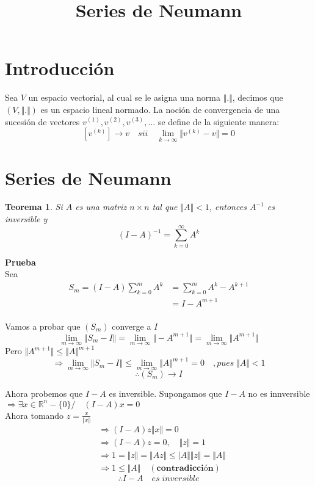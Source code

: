 \documentclass[10pt,a4paper]{article}
\title{Series de Neumann}
\newcommand{\ds}{\displaystyle}
\newcommand{\re}{\mathbb{R}}
\newtheorem{theo}{Teorema}[section]
\begin{document}
\maketitle

\section{Introducción}

Sea $V$ un espacio vectorial, al cual se le asigna una norma $\Vert .\Vert$, decimos que $(V, \Vert .\Vert)$ es un espacio lineal normado.
La noción de convergencia de una sucesión de vectores $v^{(1)}, v^{(2)}, v^{(3)},\ldots$ se define de la siguiente manera:
$$[v^{(k)}]\rightarrow v\quad sii\quad\lim_{k\rightarrow\infty}\Vert v^{(k)}-v\Vert = 0$$

\section{Series de Neumann}

\begin{theo}
	Si $A$ es una matriz $n\times n$ tal que $\Vert A\Vert <1$, entonces $A^{-1}$ es inversible y
	\begin{equation}\label{neuman's serie}
		(I-A)^{-1} = \sum_{k=0}^{\infty}A^{k} 
	\end{equation}
\end{theo}

\textbf{Prueba}\\
Sea 
\begin{align*}
	S_{m} 	= (I-A)\ds\sum_{k=0}^{m}A^{k} &= \ds\sum_{k=0}^{m}A^{k}-A^{k+1}\\
			&= I -A^{m+1}\\							 
\end{align*}

Vamos a probar que $(S_{m})$  converge a $I$
$$\lim_{m\rightarrow\infty}\Vert S_{m}-I\Vert = \lim_{m\rightarrow\infty}\Vert -A^{m+1}\Vert = \lim_{m\rightarrow\infty}\Vert A^{m+1}\Vert$$
Pero $\Vert A^{m+1}\Vert \leq\Vert A\Vert^{m+1}$
$$\Rightarrow\lim_{m\rightarrow\infty}\Vert S_{m}-I\Vert\leq\lim_{m\rightarrow\infty}\Vert A\Vert^{m+1} = 0\quad , pues\; \Vert A\Vert <1$$
\begin{equation}\label{convergencia_neumann}
\therefore (S_{m}) \rightarrow I
\end{equation}

Ahora probemos que $I-A$ es inversible.
Supongamos que $I-A$ no es innversible\\
$\Rightarrow\exists x\in \re^{n}-\{0\}/\quad (I-A)x = 0$\\
Ahora tomando $z = \frac{x}{\Vert x \Vert}$
\begin{align*}
	&\Rightarrow (I-A)z\Vert x\Vert = 0\\
	&\Rightarrow (I-A)z = 0,\quad\Vert z\Vert = 1\\
	&\Rightarrow 1 = \Vert z\Vert = \Vert Az\Vert\leq\vert A\Vert\Vert z\Vert = \Vert A\Vert\\
	&\Rightarrow 1\leq \Vert A\Vert\quad(\textbf{contradicción})
\end{align*}
$$\therefore I-A\quad es\; inversible$$
\end{document}
